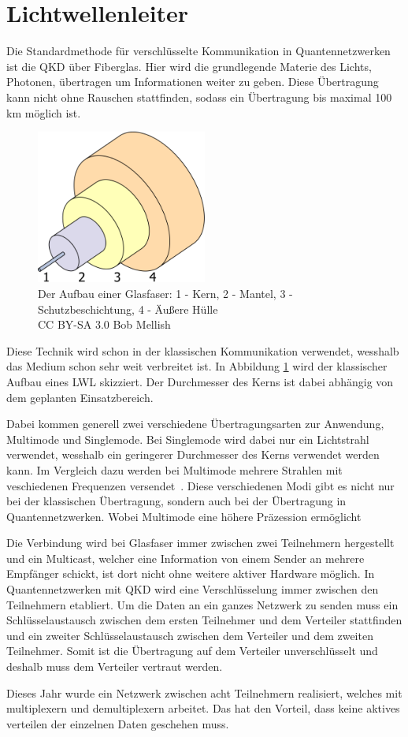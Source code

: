 \section{Lichtwellenleiter}

Die Standardmethode für verschlüsselte Kommunikation in Quantennetzwerken ist die \ac{QKD} über Fiberglas.
Hier wird die grundlegende Materie des Lichts, Photonen, übertragen um Informationen weiter zu geben.
Diese Übertragung kann nicht ohne Rauschen stattfinden, sodass ein Übertragung bis maximal 100 km möglich ist\cite{Shen2018}.

\begin{figure}[htbp] 
  \centering
     \includegraphics[width=0.5\textwidth]{img/lwl.png}
     \caption{Der Aufbau einer Glasfaser: 1 - Kern, 2 - Mantel, 3 - Schutzbeschichtung, 4 - Äußere Hülle\\
            CC BY-SA 3.0 Bob Mellish}
            \label{fig:lwlAufbau}
\end{figure}

Diese Technik wird schon in der klassischen Kommunikation verwendet, wesshalb das Medium schon sehr weit verbreitet ist.
In Abbildung \ref{fig:lwlAufbau} wird der klassischer Aufbau eines \ac{LWL} skizziert.
Der Durchmesser des Kerns ist dabei abhängig von dem geplanten Einsatzbereich.

Dabei kommen generell zwei verschiedene Übertragungsarten zur Anwendung, Multimode und Singlemode.
Bei Singlemode wird dabei nur ein Lichtstrahl verwendet, wesshalb ein geringerer Durchmesser des Kerns verwendet werden kann.
Im Vergleich dazu werden bei Multimode mehrere Strahlen mit veschiedenen Frequenzen versendet~\cite{Lichtwellenleiter}.
Diese verschiedenen Modi gibt es nicht nur bei der klassischen Übertragung, sondern auch bei der Übertragung in Quantennetzwerken.
Wobei Multimode eine höhere Präzession ermöglicht\cite{VanMeter2014}

Die Verbindung wird bei Glasfaser immer zwischen zwei Teilnehmern hergestellt und ein Multicast, welcher eine Information von einem Sender an mehrere Empfänger schickt, ist dort nicht ohne weitere aktiver Hardware möglich.
In Quantennetzwerken mit \ac{QKD} wird eine Verschlüsselung immer zwischen den Teilnehmern etabliert.
Um die Daten an ein ganzes Netzwerk zu senden muss ein Schlüsselaustausch zwischen dem ersten Teilnehmer und dem Verteiler stattfinden und ein zweiter Schlüsselaustausch zwischen dem Verteiler und dem zweiten Teilnehmer.
Somit ist die Übertragung auf dem Verteiler unverschlüsselt und deshalb muss dem Verteiler vertraut werden\cite{Qiu2018}.

Dieses Jahr wurde ein Netzwerk zwischen acht Teilnehmern realisiert, welches mit multiplexern und demultiplexern arbeitet.
Das hat den Vorteil, dass keine aktives verteilen der einzelnen Daten geschehen muss\cite{Siddarth2020}.
